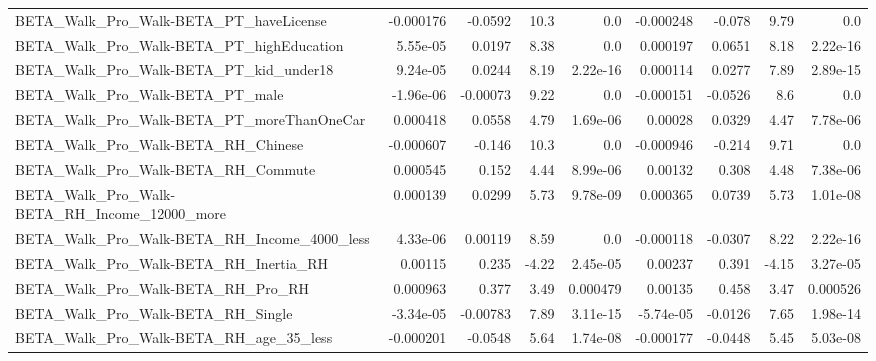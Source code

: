 \begin{tabular}{lrrrrrrrr}
BETA\_Walk\_Pro\_Walk-BETA\_PT\_haveLicense             &   -0.000176 &      -0.0592 &     10.3 &      0.0 &  -0.000248 &      -0.078 &         9.79 &           0.0 \\
BETA\_Walk\_Pro\_Walk-BETA\_PT\_highEducation           &    5.55e-05 &       0.0197 &     8.38 &      0.0 &   0.000197 &      0.0651 &         8.18 &      2.22e-16 \\
BETA\_Walk\_Pro\_Walk-BETA\_PT\_kid\_under18             &    9.24e-05 &       0.0244 &     8.19 & 2.22e-16 &   0.000114 &      0.0277 &         7.89 &      2.89e-15 \\
BETA\_Walk\_Pro\_Walk-BETA\_PT\_male                    &   -1.96e-06 &     -0.00073 &     9.22 &      0.0 &  -0.000151 &     -0.0526 &          8.6 &           0.0 \\
BETA\_Walk\_Pro\_Walk-BETA\_PT\_moreThanOneCar          &    0.000418 &       0.0558 &     4.79 & 1.69e-06 &    0.00028 &      0.0329 &         4.47 &      7.78e-06 \\
BETA\_Walk\_Pro\_Walk-BETA\_RH\_Chinese                 &   -0.000607 &       -0.146 &     10.3 &      0.0 &  -0.000946 &      -0.214 &         9.71 &           0.0 \\
BETA\_Walk\_Pro\_Walk-BETA\_RH\_Commute                 &    0.000545 &        0.152 &     4.44 & 8.99e-06 &    0.00132 &       0.308 &         4.48 &      7.38e-06 \\
BETA\_Walk\_Pro\_Walk-BETA\_RH\_Income\_12000\_more       &    0.000139 &       0.0299 &     5.73 & 9.78e-09 &   0.000365 &      0.0739 &         5.73 &      1.01e-08 \\
BETA\_Walk\_Pro\_Walk-BETA\_RH\_Income\_4000\_less        &    4.33e-06 &      0.00119 &     8.59 &      0.0 &  -0.000118 &     -0.0307 &         8.22 &      2.22e-16 \\
BETA\_Walk\_Pro\_Walk-BETA\_RH\_Inertia\_RH              &     0.00115 &        0.235 &    -4.22 & 2.45e-05 &    0.00237 &       0.391 &        -4.15 &      3.27e-05 \\
BETA\_Walk\_Pro\_Walk-BETA\_RH\_Pro\_RH                  &    0.000963 &        0.377 &     3.49 & 0.000479 &    0.00135 &       0.458 &         3.47 &      0.000526 \\
BETA\_Walk\_Pro\_Walk-BETA\_RH\_Single                  &   -3.34e-05 &     -0.00783 &     7.89 & 3.11e-15 &  -5.74e-05 &     -0.0126 &         7.65 &      1.98e-14 \\
BETA\_Walk\_Pro\_Walk-BETA\_RH\_age\_35\_less             &   -0.000201 &      -0.0548 &     5.64 & 1.74e-08 &  -0.000177 &     -0.0448 &         5.45 &      5.03e-08 \\

\end{tabular}
